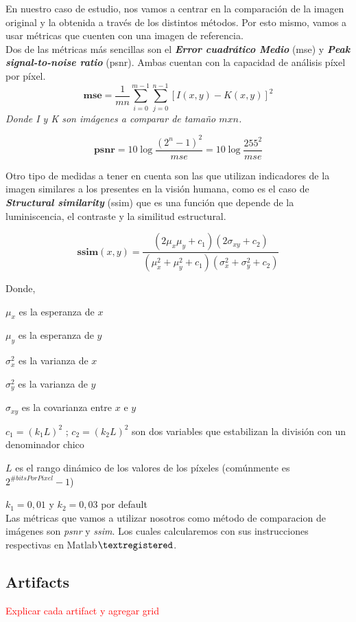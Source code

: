\documentclass[a4paper]{article}
\begin{document}
En nuestro caso de estudio, nos vamos a centrar en la comparaci\'on de la imagen original y la obtenida a trav\'es de los distintos m\'etodos. Por esto mismo, vamos a usar m\'etricas que cuenten con una imagen de referencia.\\

 Dos de las m\'etricas m\'as sencillas son el \emph{\textbf{Error cuadr\'atico Medio}} (mse) y \emph{\textbf{Peak signal-to-noise ratio}} (psnr). Ambas cuentan con la capacidad de an\'alisis p\'ixel por p\'ixel.\\

\[
 \textbf{mse} = \frac{1}{mn} \sum_{i=0}^{m-1} \sum_{j=0}^{n-1} [I(x,y) - K(x,y)]^2
\]
  \indent \indent \indent \textit{Donde I y K son imágenes a comparar de tamaño $mxn$.}



\[
 \textbf{psnr} = 10 \log \frac{(2^n-1)^2}{mse} = 10 \log \frac{255^2}{mse}
\]

Otro tipo de medidas a tener en cuenta son las que utilizan indicadores de la imagen similares a los presentes en la visi\'on humana, como es el caso de \emph{\textbf{Structural similarity}} (ssim) que es una funci\'on que depende de la luminiscencia, el contraste y la similitud estructural.

\[
 \textbf{ssim}(x,y) = \frac{(2\mu_x\mu_y+c_1)(2\sigma_{xy}+c_2)}{(\mu_x^2+\mu_y^2+c_1)(\sigma_x^2+\sigma_y^2+c_2)}
\]

\noindent Donde, 

$\mu_x$ es la esperanza de $x$

$\mu_y$ es la esperanza de $y$

$\sigma_x^2$ es la varianza de $x$

$\sigma_y^2$ es la varianza de $y$

$\sigma_{xy}$ es la covarianza entre $x$ e $y$

$c_1 = (k_1L)^2$ ; $c_2 = (k_2L)^2$ son dos variables que estabilizan la divisi\'on con un denominador chico

$L$ es el rango din\'amico de los valores de los p\'ixeles (com\'unmente es $2^{\#bitsPorPixel}-1$)

$k_1 = 0,01$ y $k_2 = 0,03$ por default\\

Las m\'etricas que vamos a utilizar nosotros como m\'etodo de comparacion de im\'agenes son \emph{psnr} y \emph{ssim}. Los cuales calcularemos con sus instrucciones respectivas en Matlab$\textregistered$.

\newpage
\subsection{Artifacts}
\textcolor{red}{Explicar cada artifact y agregar grid}
\end{document}

